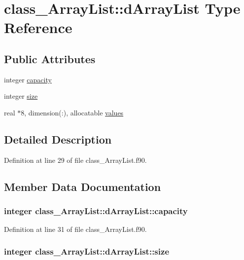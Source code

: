 \hypertarget{typeclass__ArrayList_1_1dArrayList}{
\section{class\_\-ArrayList::dArrayList Type Reference}
\label{typeclass__ArrayList_1_1dArrayList}
}
\subsection*{Public Attributes}
\begin{DoxyCompactItemize}
\item 
integer \hyperlink{typeclass__ArrayList_1_1dArrayList_a4b761209808b8e9f68cf258f4b524586}{capacity}
\item 
integer \hyperlink{typeclass__ArrayList_1_1dArrayList_ab1239e5761e95fbfdf1963268268fec2}{size}
\item 
real $\ast$8, dimension(:), allocatable \hyperlink{typeclass__ArrayList_1_1dArrayList_a7972abce1835eeb0be28d57f59de952e}{values}
\end{DoxyCompactItemize}


\subsection{Detailed Description}


Definition at line 29 of file class\_\-ArrayList.f90.



\subsection{Member Data Documentation}
\hypertarget{typeclass__ArrayList_1_1dArrayList_a4b761209808b8e9f68cf258f4b524586}{
\subsubsection[{capacity}]{\setlength{\rightskip}{0pt plus 5cm}integer {\bf class\_\-ArrayList::dArrayList::capacity}}}
\label{typeclass__ArrayList_1_1dArrayList_a4b761209808b8e9f68cf258f4b524586}


Definition at line 31 of file class\_\-ArrayList.f90.

\hypertarget{typeclass__ArrayList_1_1dArrayList_ab1239e5761e95fbfdf1963268268fec2}{
\subsubsection[{size}]{\setlength{\rightskip}{0pt plus 5cm}integer {\bf class\_\-ArrayList::dArrayList::size}}}
\label{typeclass__ArrayList_1_1dArrayList_ab1239e5761e95fbfdf1963268268fec2}


